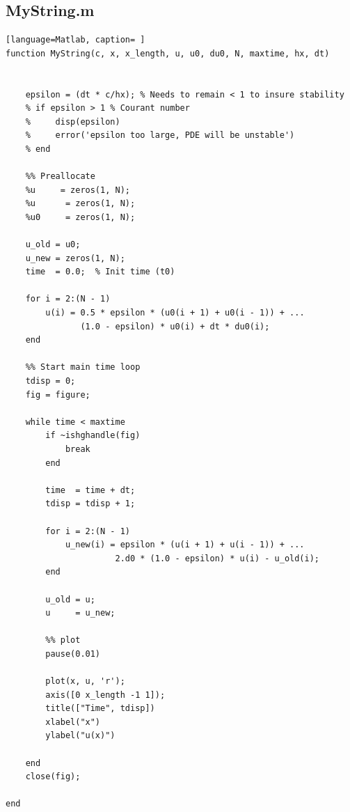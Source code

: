 \documentclass[12pt]{article}
\begin{document}
\subsection*{MyString.m}
\begin{lstlisting}[language=Matlab, caption= ]
function MyString(c, x, x_length, u, u0, du0, N, maxtime, hx, dt)


    epsilon = (dt * c/hx); % Needs to remain < 1 to insure stability 
    % if epsilon > 1 % Courant number
    %     disp(epsilon)
    %     error('epsilon too large, PDE will be unstable')
    % end

    %% Preallocate
    %u     = zeros(1, N);
    %u      = zeros(1, N);
    %u0     = zeros(1, N);

    u_old = u0;
    u_new = zeros(1, N);
    time  = 0.0;  % Init time (t0)

    for i = 2:(N - 1)
        u(i) = 0.5 * epsilon * (u0(i + 1) + u0(i - 1)) + ... 
               (1.0 - epsilon) * u0(i) + dt * du0(i); 
    end 

    %% Start main time loop 
    tdisp = 0;
    fig = figure;

    while time < maxtime 
        if ~ishghandle(fig)
            break
        end

        time  = time + dt;
        tdisp = tdisp + 1;

        for i = 2:(N - 1) 
            u_new(i) = epsilon * (u(i + 1) + u(i - 1)) + ... 
                      2.d0 * (1.0 - epsilon) * u(i) - u_old(i);
        end 

        u_old = u; 
        u     = u_new; 

        %% plot
        pause(0.01)

        plot(x, u, 'r');
        axis([0 x_length -1 1]);
        title(["Time", tdisp])
        xlabel("x")
        ylabel("u(x)")

    end
    close(fig);

end
\end{lstlisting}


%

 
\end{document}
